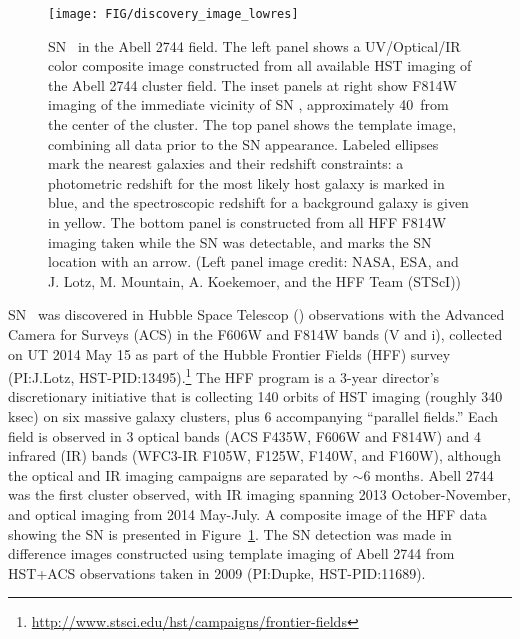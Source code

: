 \begin{figure}
\begin{center}
\texttt{[image: FIG/discovery\_image\_lowres]}
\caption{  \label{fig:DiscoveryImage} 
SN \tomas\ in the Abell 2744 field.  The left panel shows a
UV/Optical/IR color composite image constructed from all available HST
imaging of the Abell 2744 cluster field.  The inset panels at right
show F814W imaging of the immediate vicinity of SN \tomas,
approximately 40\arcsec\ from the center of the cluster. The top panel
shows the template image, combining all data prior to the SN
appearance.  Labeled ellipses mark the nearest galaxies and their
redshift constraints: a photometric redshift for the most likely host
galaxy is marked in blue, and the spectroscopic redshift for a
background galaxy is given in yellow. The bottom panel is constructed
from all HFF F814W imaging taken while the SN was detectable, and
marks the SN location with an arrow.  (Left panel image credit: NASA,
ESA, and J. Lotz, M. Mountain, A. Koekemoer, and the HFF Team (STScI))
}
\end{center}
\end{figure}


SN \tomas\ was discovered in Hubble Space Telescop (\HST) observations
with the Advanced Camera for Surveys (ACS) in the F606W and F814W
bands (V and i), collected on UT 2014 May 15 as part of the Hubble
Frontier Fields (HFF) survey (PI:J.Lotz,
HST-PID:13495).\footnote{\url{http://www.stsci.edu/hst/campaigns/frontier-fields}}
The HFF program is a 3-year director's discretionary initiative that
is collecting 140 orbits of HST imaging (roughly 340 ksec) on six
massive galaxy clusters, plus 6 accompanying ``parallel fields.''
Each field is observed in 3 optical bands (ACS F435W, F606W and F814W)
and 4 infrared (IR) bands (WFC3-IR F105W, F125W, F140W, and F160W),
although the optical and IR imaging campaigns are separated by $\sim$6
months. Abell 2744 was the first cluster observed, with IR imaging
spanning 2013 October-November, and optical imaging from 2014
May-July.  A composite image of the HFF data showing the SN is
presented in Figure~\ref{fig:DiscoveryImage}.  The SN detection was
made in difference images constructed using template imaging of Abell
2744 from HST+ACS observations taken in 2009 (PI:Dupke,
HST-PID:11689).



